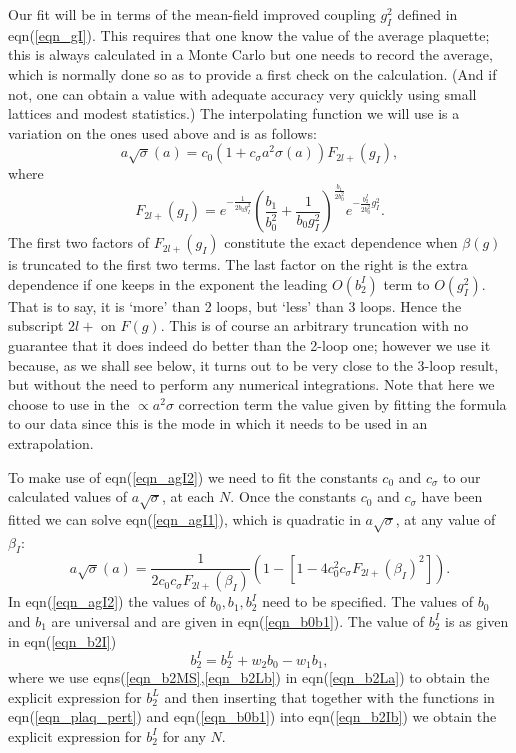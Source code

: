 \documentclass[12pt]{article}
\newcommand{\be}{\begin{equation}}
\newcommand{\ee}{\end{equation}}
\begin{document}
Our fit will be in terms of the mean-field improved coupling $g^2_I$ defined
in eqn(\ref{eqn_gI}). This requires that one know the value of the average plaquette;
this is always calculated in a Monte Carlo but one needs to record the
average, which is normally done so as to provide a first check on the calculation.
(And if not, one can obtain a value with adequate accuracy very quickly
using small lattices and modest statistics.)
The interpolating function we will use is a variation on the ones used above
and is as follows:
%
\be
a \sqrt\sigma(a) =  c_0 \left( 1 + c_{\sigma} a^2\sigma(a) \right) F_{2l+}(g_I),
\label{eqn_agI1}
\ee
%
where
%
\be
F_{2l+}(g_I)
=
e^{-\frac{1}{2b_0 g_I^2}}
\left(\frac{b_1}{b_0^2}+\frac{1}{b_0 g_I^2}
\right)^{\frac{b_1}{2b_0^2}} 
e^{-\frac{b^I_2}{2b_0^2}g_I^2}.
\label{eqn_agI2}
\ee
%
The first two factors of $F_{2l+}(g_I)$ constitute the exact dependence when $\beta(g)$ is
truncated to the first two terms. The last factor on the right is the extra dependence
if one keeps in the exponent the leading $O(b^I_2)$ term to $O(g^2_I)$.
That is to say, it is `more' than 2 loops, but `less' than 3 loops. Hence the subscript
$2l+$ on $F(g)$. This is of course an arbitrary truncation with no guarantee that it
does indeed do better than the 2-loop one; however we use it because, as we shall see
below, it turns out to be very close to the 3-loop result, but without the need to
perform any numerical integrations. Note that here we choose to use in the $\propto a^2\sigma$
correction term the value given by fitting the formula to our data since this is the
mode in which it needs to be used in an extrapolation.

To make use of eqn(\ref{eqn_agI2}) we need to fit the constants $c_0$ and $c_{\sigma}$ to our
calculated values of $a\surd\sigma$, at each $N$. Once the constants $c_0$ and $c_{\sigma}$
have been fitted we can solve eqn(\ref{eqn_agI1}), which is quadratic in $a\surd\sigma$, at
any value of $\beta_I$:
%
\be
a \sqrt\sigma(a) =  \frac{1}{2c_0c_{\sigma}F_{2l+}(\beta_I)}
  \left(1-\left[1 - 4c^2_0c_{\sigma}F_{2l+}(\beta_I)^2\right]\right).
\label{eqn_aKgI}
\ee
%
In  eqn(\ref{eqn_agI2}) the values of $b_0,b_1,b^I_2$ need to be specified. The values of
$b_0$ and $b_1$ are  universal and are given in eqn(\ref{eqn_b0b1}). The value of $b^I_2$
is as given in eqn(\ref{eqn_b2I}) 
%
\be
b^I_2=b^L_2+w_2b_0-w_1b_1,
\label{eqn_b2Ib}
\ee
where we use eqns(\ref{eqn_b2MS},\ref{eqn_b2Lb}) in eqn(\ref{eqn_b2La}) to obtain the
explicit expression for $b^L_2$ and then inserting that together with the functions in
eqn(\ref{eqn_plaq_pert}) and eqn(\ref{eqn_b0b1}) into eqn(\ref{eqn_b2Ib}) we
obtain the explicit expression for $b^I_2$ for any $N$. 
\end{document}
